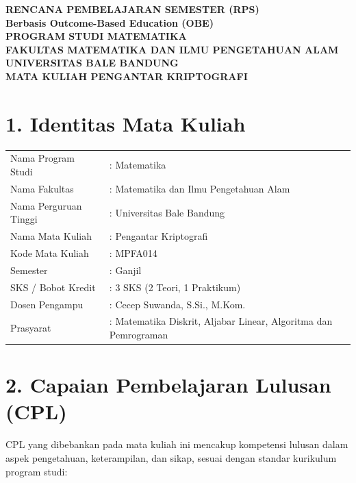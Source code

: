 \documentclass[12pt,a4paper]{article}
\begin{document}
\begin{center}
\textbf{\Large RENCANA PEMBELAJARAN SEMESTER (RPS)}\\
\textbf{Berbasis Outcome-Based Education (OBE)}\\[0.5cm]
\textbf{PROGRAM STUDI MATEMATIKA}\\
\textbf{FAKULTAS MATEMATIKA DAN ILMU PENGETAHUAN ALAM}\\
\textbf{UNIVERSITAS BALE BANDUNG}\\
\textbf{MATA KULIAH PENGANTAR KRIPTOGRAFI}\\
\end{center}

\vspace{1cm}

\section*{1. Identitas Mata Kuliah}
\begin{tabular}{lp{10cm}}
Nama Program Studi & : Matematika \\
Nama Fakultas & : Matematika dan Ilmu Pengetahuan Alam \\
Nama Perguruan Tinggi & : Universitas Bale Bandung \\
Nama Mata Kuliah & : Pengantar Kriptografi \\
Kode Mata Kuliah & : MPFA014 \\
Semester & : Ganjil \\
SKS / Bobot Kredit & : 3 SKS (2 Teori, 1 Praktikum) \\
Dosen Pengampu & : Cecep Suwanda, S.Si., M.Kom. \\
Prasyarat & : Matematika Diskrit, Aljabar Linear, Algoritma dan Pemrograman \\
\end{tabular}

\vspace{0.5cm}

\section*{2. Capaian Pembelajaran Lulusan (CPL)}

CPL yang dibebankan pada mata kuliah ini mencakup kompetensi lulusan dalam aspek pengetahuan, keterampilan, dan sikap, sesuai dengan standar kurikulum program studi:
\end{document}
